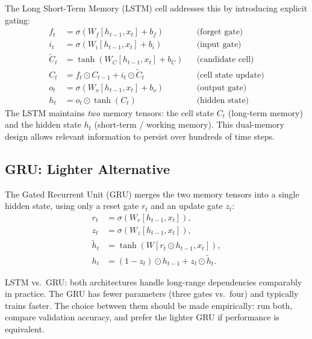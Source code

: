 \documentclass[12pt,a4paper]{article}
\begin{document}
The Long Short-Term Memory (LSTM) cell addresses this by introducing explicit gating:
\begin{align}
  f_t &= \sigma\!\left(W_f [h_{t-1}, x_t] + b_f\right) & &\text{(forget gate)} \label{eq:lstm_f}\\
  i_t &= \sigma\!\left(W_i [h_{t-1}, x_t] + b_i\right) & &\text{(input gate)} \label{eq:lstm_i}\\
  \tilde{C}_t &= \tanh\!\left(W_C [h_{t-1}, x_t] + b_C\right) & &\text{(candidate cell)} \label{eq:lstm_cc}\\
  C_t &= f_t \odot C_{t-1} + i_t \odot \tilde{C}_t & &\text{(cell state update)} \label{eq:lstm_c}\\
  o_t &= \sigma\!\left(W_o [h_{t-1}, x_t] + b_o\right) & &\text{(output gate)} \label{eq:lstm_o}\\
  h_t &= o_t \odot \tanh(C_t) & &\text{(hidden state)} \label{eq:lstm_h}
\end{align}
The LSTM maintains \emph{two} memory tensors: the cell state $C_t$ (long-term memory) and the
hidden state $h_t$ (short-term / working memory). This dual-memory design allows relevant
information to persist over hundreds of time steps.

\subsection{GRU: Lighter Alternative}

The Gated Recurrent Unit (GRU) merges the two memory tensors into a single hidden state, using only
a reset gate $r_t$ and an update gate $z_t$:
\begin{align}
  r_t &= \sigma\!\left(W_r [h_{t-1}, x_t]\right), \label{eq:gru_r}\\
  z_t &= \sigma\!\left(W_z [h_{t-1}, x_t]\right), \label{eq:gru_z}\\
  \tilde{h}_t &= \tanh\!\left(W [r_t \odot h_{t-1}, x_t]\right), \label{eq:gru_htilde}\\
  h_t &= (1 - z_t) \odot h_{t-1} + z_t \odot \tilde{h}_t. \label{eq:gru_h}
\end{align}

\begin{keyinsight}
  LSTM vs.\ GRU: both architectures handle long-range dependencies comparably in practice.
  The GRU has fewer parameters (three gates vs.\ four) and typically trains faster. The choice
  between them should be made empirically: run both, compare validation accuracy, and prefer the
  lighter GRU if performance is equivalent.
\end{keyinsight}
\end{document}
